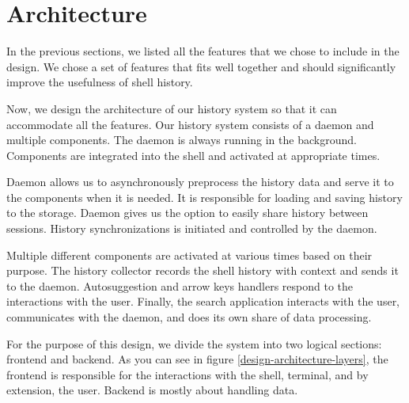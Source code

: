 \newpage
\section{Architecture}

In the previous sections, we listed all the features that we chose to include in the design. We chose a set of features that fits well together and should significantly improve the usefulness of shell history.

Now, we design the architecture of our history system so that it can accommodate all the features. 
Our history system consists of a daemon and multiple components. The daemon is always running in the background. Components are integrated into the shell and activated at appropriate times. 


Daemon allows us to asynchronously preprocess the history data and serve it to the components when it is needed. It is responsible for loading and saving history to the storage. Daemon gives us the option to easily share history between sessions. History synchronizations is initiated and controlled by the daemon.


Multiple different components are activated at various times based on their purpose. The history collector records the shell history with context and sends it to the daemon. Autosuggestion and arrow keys handlers respond to the interactions with the user. Finally, the search application interacts with the user, communicates with the daemon, and does its own share of data processing.


For the purpose of this design, we divide the system into two logical sections: frontend and backend. As you can see in figure \ref{design-architecture-layers}, the frontend is responsible for the interactions with the shell, terminal, and by extension, the user. Backend is mostly about handling data. 

